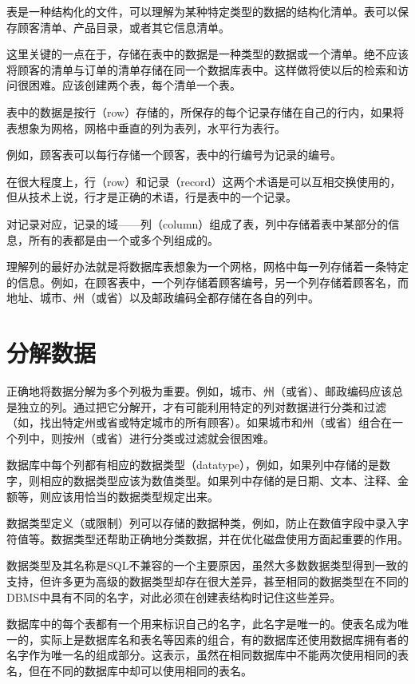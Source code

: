 表是一种结构化的文件，可以理解为某种特定类型的数据的结构化清单。表可以保存顾客清单、产品目录，或者其它信息清单。

这里关键的一点在于，存储在表中的数据是一种类型的数据或一个清单。绝不应该将顾客的清单与订单的清单存储在同一个数据库表中。这样做将使以后的检索和访问很困难。应该创建两个表，每个清单一个表。

表中的数据是按行（row）存储的，所保存的每个记录存储在自己的行内，如果将表想象为网格，网格中垂直的列为表列，水平行为表行。

例如，顾客表可以每行存储一个顾客，表中的行编号为记录的编号。

在很大程度上，行（row）和记录（record）这两个术语是可以互相交换使用的，但从技术上说，行才是正确的术语，行是表中的一个记录。

对记录对应，记录的域——列（column）组成了表，列中存储着表中某部分的信息，所有的表都是由一个或多个列组成的。

理解列的最好办法就是将数据库表想象为一个网格，网格中每一列存储着一条特定的信息。例如，在顾客表中，一个列存储着顾客编号，另一个列存储着顾客名，而地址、城市、州（或省）以及邮政编码全都存储在各自的列中。




\section{分解数据}


正确地将数据分解为多个列极为重要。例如，城市、州（或省）、邮政编码应该总是独立的列。通过把它分解开，才有可能利用特定的列对数据进行分类和过滤（如，找出特定州或省或特定城市的所有顾客）。如果城市和州（或省）组合在一个列中，则按州（或省）进行分类或过滤就会很困难。

数据库中每个列都有相应的数据类型（datatype），例如，如果列中存储的是数字，则相应的数据类型应该为数值类型。如果列中存储的是日期、文本、注释、金额等，则应该用恰当的数据类型规定出来。

数据类型定义（或限制）列可以存储的数据种类，例如，防止在数值字段中录入字符值等。数据类型还帮助正确地分类数据，并在优化磁盘使用方面起重要的作用。

数据类型及其名称是SQL不兼容的一个主要原因，虽然大多数数据类型得到一致的支持，但许多更为高级的数据类型却存在很大差异，甚至相同的数据类型在不同的DBMS中具有不同的名字，对此必须在创建表结构时记住这些差异。

数据库中的每个表都有一个用来标识自己的名字，此名字是唯一的。使表名成为唯一的，实际上是数据库名和表名等因素的组合，有的数据库还使用数据库拥有者的名字作为唯一名的组成部分。这表示，虽然在相同数据库中不能两次使用相同的表名，但在不同的数据库中却可以使用相同的表名。

